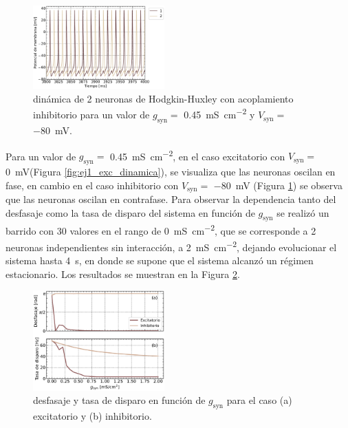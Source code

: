 \documentclass[11pt, twocolumn]{article}
\begin{document}
\begin{figure} [htbp]
    \centering
    \includegraphics[width=0.45\textwidth]{figuras/inhibitorio.pdf}
    \caption{dinámica de 2 neuronas de Hodgkin-Huxley con acoplamiento inhibitorio para un valor de \(g_\text{syn} =\) \SI{0.45}{\milli\siemens\per \centi\meter\squared} y \(V_\text{syn} =\) \SI{-80}{\milli\volt}.}
    \label{fig:ej1_inh_dinamica}
\end{figure}

Para un valor de \(g_\text{syn} =\) \SI{0.45}{\milli\siemens\per \centi\meter\squared}, en el caso excitatorio con \(V_\text{syn} =\) \SI{0}{\milli\volt}(Figura \ref{fig:ej1_exc_dinamica}), se visualiza que las neuronas oscilan en fase, en cambio en el caso inhibitorio con \(V_\text{syn} =\) \SI{-80}{\milli\volt} (Figura \ref{fig:ej1_inh_dinamica}) se observa que las neuronas oscilan en contrafase. Para observar la dependencia tanto del desfasaje como la tasa de disparo del sistema en función de \(g_\text{syn}\) se realizó un barrido con 30 valores en el rango de \SI{0}{\milli\siemens\per \centi\meter\squared}, que se corresponde a 2 neuronas independientes sin interacción, a \SI{2}{\milli\siemens\per \centi\meter\squared}, dejando evolucionar el sistema hasta \SI{4}{\second}, en donde se supone que el sistema alcanzó un régimen estacionario. Los resultados se muestran en la Figura \ref{fig:ej1_barrido}.

\begin{figure} [htbp]
    \centering
    \includegraphics[width=0.45\textwidth]{figuras/barrido_nsyn.pdf}
    \caption{desfasaje y tasa de disparo en función de \(g_\text{syn}\) para el caso (a) excitatorio y (b) inhibitorio.}
    \label{fig:ej1_barrido}
\end{figure}
\end{document}
